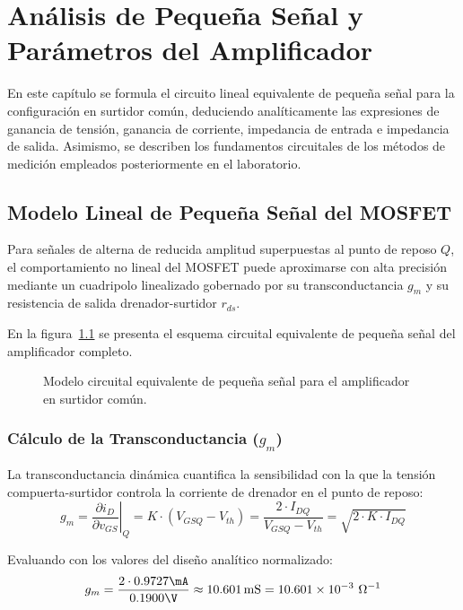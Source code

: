 \chapter{Análisis de Pequeña Señal y Parámetros del Amplificador}
\label{chap:pequena_senal}

En este capítulo se formula el circuito lineal equivalente de pequeña señal para la configuración en surtidor común,
deduciendo analíticamente las expresiones de ganancia de tensión, ganancia de corriente, impedancia
de entrada e impedancia de salida. Asimismo, se describen los fundamentos circuitales de los métodos de medición
empleados posteriormente en el laboratorio.

\section{Modelo Lineal de Pequeña Señal del MOSFET}

Para señales de alterna de reducida amplitud superpuestas al punto de reposo $Q$, el comportamiento no lineal del
MOSFET puede aproximarse con alta precisión mediante un cuadripolo linealizado gobernado por su transconductancia $g_m$
y su resistencia de salida drenador-surtidor $r_{ds}$.

En la figura~\ref{crkt:pequena_senal} se presenta el esquema circuital equivalente de pequeña señal del amplificador
completo.

\begin{figure}[!ht]
  \centering
  
  \caption{Modelo circuital equivalente de pequeña señal para el amplificador en surtidor común.}
  \label{crkt:pequena_senal}
\end{figure}

\subsection{Cálculo de la Transconductancia (\texorpdfstring{$g_m$}{gm})}
La transconductancia dinámica cuantifica la sensibilidad con la que la tensión compuerta-surtidor controla la corriente
de drenador en el punto de reposo:
\begin{equation}
  g_m = \left.\frac{\partial i_D}{\partial v_{GS}}\right|_{Q} = K \cdot (V_{GSQ} - V_{th}) = \frac{2 \cdot I_{DQ}}{V_{GSQ} - V_{th}} = \sqrt{2 \cdot K \cdot I_{DQ}}
  \label{eq:gm_formula}
\end{equation}

Evaluando con los valores del diseño analítico normalizado:
\begin{equation}
  g_m = \frac{2 \cdot 0.9727\mA}{0.1900\V} \approx 10.601\mS = 10.601 \times 10^{-3}\ \Omega^{-1}
  \label{eq:gm_calculada}
\end{equation}

